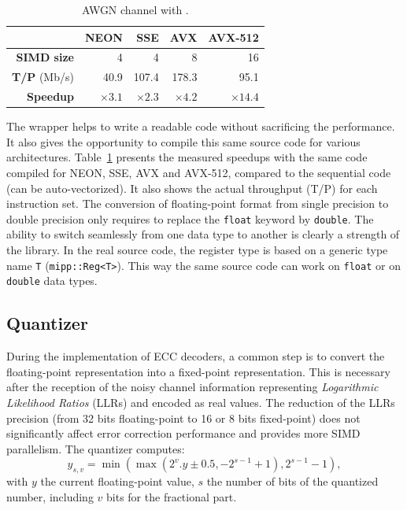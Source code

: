 \begin{table}[htp]
  \centering
  \caption{AWGN channel with \MIPP.}
  \label{tab:vec_awgn_speedup}
  \begin{tabular}{r | r  r r r}
                      & \textbf{NEON} & \textbf{SSE} & \textbf{AVX} & \textbf{AVX-512} \\ \hline \hline
  \textbf{SIMD size}  & 4             & 4            & 8            & 16               \\ %
  \textbf{T/P} (Mb/s) & 40.9          & 107.4        & 178.3        & 95.1             \\ %
  \textbf{Speedup}    & $\times 3.1$  & $\times 2.3$ & $\times 4.2$ & $\times 14.4$    \\
  \end{tabular}
\end{table}

The \MIPP wrapper helps to write a readable code without sacrificing the
performance. It also gives the opportunity to compile this same source code for
various architectures. Table~\ref{tab:vec_awgn_speedup} presents the measured
speedups with the same \MIPP code compiled for NEON, SSE, AVX and AVX-512,
compared to the sequential code (can be auto-vectorized). It also shows the
actual throughput (T/P) for each instruction set. The conversion of
floating-point format from single precision to double precision only requires to
replace the \verb|float| keyword by \verb|double|. The ability to switch
seamlessly from one data type to another is clearly a strength of the \MIPP
library. In the real source code, the register type is based on a generic type
name \verb|T| (\verb|mipp::Reg<T>|). This way the same source code can work on
\verb|float| or on \verb|double| data types.

\subsection{Quantizer}
\label{sec:opt_simu_quantizer}

During the implementation of ECC decoders, a common step is to convert the
floating-point representation into a fixed-point representation. This is
necessary after the reception of the noisy channel information representing
\textit{Logarithmic Likelihood Ratios} (LLRs) and encoded as real values. The
reduction of the LLRs precision (from 32 bits floating-point to 16 or 8 bits
fixed-point) does not significantly affect error correction performance and
provides more SIMD parallelism. The quantizer computes:
\begin{equation*}
y_{s,v} = \min(\max(2^v . y \pm 0.5, -2^{s-1} +1), 2^{s-1} -1),
\end{equation*}
with $y$ the current floating-point value, $s$ the number of bits of the
quantized number, including $v$ bits for the fractional part.

